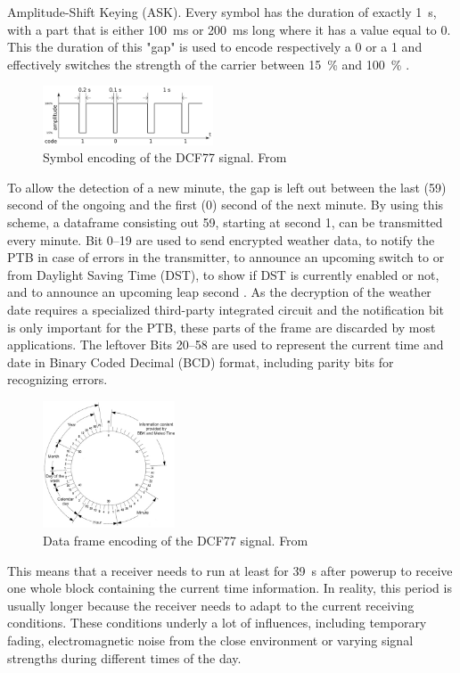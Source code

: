 \documentclass[conference]{IEEEtran}
\begin{document}
Amplitude-Shift Keying (ASK). Every symbol has the duration of exactly \SI{1}{\second}, with a part that is either \SI{100}{\milli\second} or \SI{200}{\milli\second}
long where it has a value equal to 0.
This the duration of this "gap" is used to encode respectively a 0 or a 1 and effectively switches the strength of the carrier between \SI{15}{\percent} and \SI{100}{\percent} \cite{b5}.
\begin{figure}[htbp]
    \centerline{\includegraphics[width=0.45\textwidth]{img/dcf77_symbol_encoding.png}}
    \caption{Symbol encoding of the DCF77 signal. From \cite{b1}}
    \label{fig:dcf77_symbol_encoding}
\end{figure}
\FloatBarrier\noindent
To allow the detection of a new minute, the gap is left out between the last (59) second of the ongoing and the first (0) second of the next minute.
By using this scheme, a dataframe consisting out \SI{59}{\Bit}, starting at second 1, can be transmitted every minute.
Bit \SIrange{0}{19}{} are used to send encrypted weather data, to notify the PTB in case of errors in the transmitter, to announce an upcoming
switch to or from Daylight Saving Time (DST), to show if DST is currently enabled or not, and to announce an upcoming leap second \cite{b5}.
As the decryption of the weather date requires a specialized third-party integrated circuit and the notification bit is only important for the PTB, these parts
of the frame are discarded by most applications.
The leftover Bits \SIrange{20}{58}{} are used to represent the current time and date in Binary Coded Decimal (BCD) format, including parity bits for recognizing errors.
\begin{figure}[htbp]
    \centerline{\includegraphics[width=0.35\textwidth]{img/dcf77_frame_encoding.jpg}}
    \caption{Data frame encoding of the DCF77 signal. From \cite{b5}}
    \label{fig:dcf77_data_encoding}
\end{figure}
\FloatBarrier\noindent
This means that a receiver needs to run at least for \SI{39}{\second} after powerup to receive one whole block containing the current time information.
In reality, this period is usually longer because the receiver needs to adapt to the current receiving conditions. 
These conditions underly a lot of influences, including temporary fading, electromagnetic noise from the close environment or varying signal strengths
during different times of the day.
\end{document}
